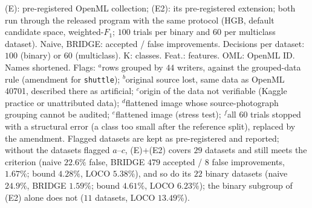 \begin{table}[!t]
\vspace{2pt}
\parbox{\textwidth}{\justifying\scriptsize *(E): pre-registered OpenML collection; (E2): its pre-registered extension; both run through the released program with the same protocol (HGB, default candidate space, weighted-$F_1$; $100$ trials per binary and $60$ per multiclass dataset). Naive, BRIDGE: accepted / false improvements. Decisions per dataset: $100$ (binary) or $60$ (multiclass). K: classes. Feat.: features. OML: OpenML ID. Names shortened. Flags: $^{a}$rows grouped by $44$ writers, against the grouped-data rule (amendment for \texttt{shuttle}); $^{b}$original source lost, same data as OpenML 40701, described there as artificial; $^{c}$origin of the data not verifiable (Kaggle practice or unattributed data); $^{d}$flattened image whose source-photograph grouping cannot be audited; $^{e}$flattened image (stress test); $^{f}$all $60$ trials stopped with a structural error (a class too small after the reference split), replaced by the amendment. Flagged datasets are kept as pre-registered and reported; without the datasets flagged $a$--$c$, (E)+(E2) covers $29$ datasets and still meets the criterion (naive $22.6\%$ false, BRIDGE $479$ accepted / $8$ false improvements, $1.67\%$; bound $4.28\%$, LOCO $5.38\%$), and so do its $22$ binary datasets (naive $24.9\%$, BRIDGE $1.59\%$; bound $4.61\%$, LOCO $6.23\%$); the binary subgroup of (E2) alone does not ($11$ datasets, LOCO $13.49\%$).}
\end{table}
